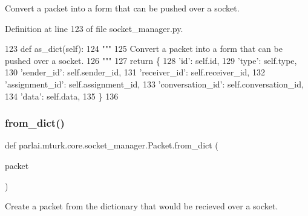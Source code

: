 \begin{DoxyVerb}Convert a packet into a form that can be pushed over a socket.
\end{DoxyVerb}
 

Definition at line 123 of file socket\+\_\+manager.\+py.


\begin{DoxyCode}
123     \textcolor{keyword}{def }as\_dict(self):
124         \textcolor{stringliteral}{"""}
125 \textcolor{stringliteral}{        Convert a packet into a form that can be pushed over a socket.}
126 \textcolor{stringliteral}{        """}
127         \textcolor{keywordflow}{return} \{
128             \textcolor{stringliteral}{'id'}: self.id,
129             \textcolor{stringliteral}{'type'}: self.type,
130             \textcolor{stringliteral}{'sender\_id'}: self.sender\_id,
131             \textcolor{stringliteral}{'receiver\_id'}: self.receiver\_id,
132             \textcolor{stringliteral}{'assignment\_id'}: self.assignment\_id,
133             \textcolor{stringliteral}{'conversation\_id'}: self.conversation\_id,
134             \textcolor{stringliteral}{'data'}: self.data,
135         \}
136 
\end{DoxyCode}
\mbox{\label{classparlai_1_1mturk_1_1core_1_1socket__manager_1_1Packet_aa186d3b3ba07b6c2eba5e241cbaf92f8}} 
\subsubsection{\texorpdfstring{from\+\_\+dict()}{from\_dict()}}
{\footnotesize\ttfamily def parlai.\+mturk.\+core.\+socket\+\_\+manager.\+Packet.\+from\+\_\+dict (\begin{DoxyParamCaption}\item[{}]{packet }\end{DoxyParamCaption})\hspace{0.3cm}{\ttfamily [static]}}

\begin{DoxyVerb}Create a packet from the dictionary that would be recieved over a socket.
\end{DoxyVerb}
 

